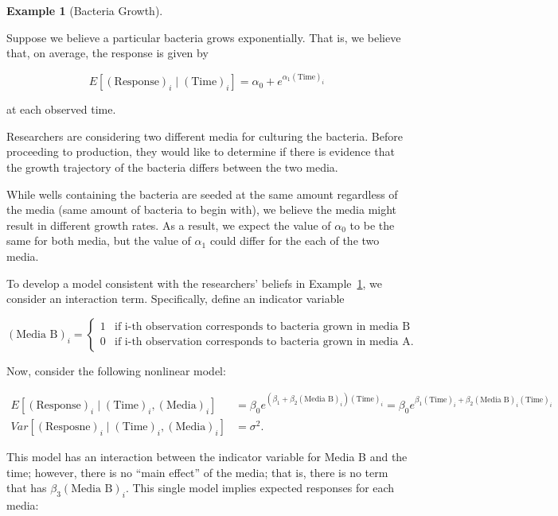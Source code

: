 \documentclass[
  letterpaper,
  DIV=11,
  numbers=noendperiod]{scrreprt}
\theoremstyle{definition}
\theoremstyle{definition}
\newtheorem{example}{Example}[chapter]
\theoremstyle{remark}
\begin{document}
\begin{example}[Bacteria
Growth]\protect\hypertarget{exm-nlm-bacteria}{}\label{exm-nlm-bacteria}

Suppose we believe a particular bacteria grows exponentially. That is,
we believe that, on average, the response is given by

\[E\left[(\text{Response})_i \mid (\text{Time})_i\right] = \alpha_0 + e^{\alpha_1 (\text{Time})_i}\]

at each observed time.

Researchers are considering two different media for culturing the
bacteria. Before proceeding to production, they would like to determine
if there is evidence that the growth trajectory of the bacteria differs
between the two media.

While wells containing the bacteria are seeded at the same amount
regardless of the media (same amount of bacteria to begin with), we
believe the media might result in different growth rates. As a result,
we expect the value of \(\alpha_0\) to be the same for both media, but
the value of \(\alpha_1\) could differ for the each of the two media.

\end{example}

To develop a model consistent with the researchers' beliefs in
Example~\ref{exm-nlm-bacteria}, we consider an interaction term.
Specifically, define an indicator variable

\[(\text{Media B})_i = \begin{cases} 1 & \text{if i-th observation corresponds to bacteria grown in media B} \\ 0 & \text{if i-th observation corresponds to bacteria grown in media A.} \end{cases}\]

Now, consider the following nonlinear model:

\[
\begin{aligned}
  E\left[(\text{Response})_i \mid (\text{Time})_i, (\text{Media})_i\right] 
    &= \beta_0 e^{\left(\beta_1 + \beta_{2} (\text{Media B})_i\right) (\text{Time})_i} = \beta_0 e^{\beta_1 (\text{Time})_i + \beta_{2} (\text{Media B})_i (\text{Time})_i} \\
  Var\left[(\text{Resposne})_i \mid (\text{Time})_i, (\text{Media})_i\right]
    &= \sigma^2.
\end{aligned}
\]

This model has an interaction between the indicator variable for Media B
and the time; however, there is no ``main effect'' of the media; that
is, there is no term that has \(\beta_3 (\text{Media B})_i\). This
single model implies expected responses for each media:
\end{document}
